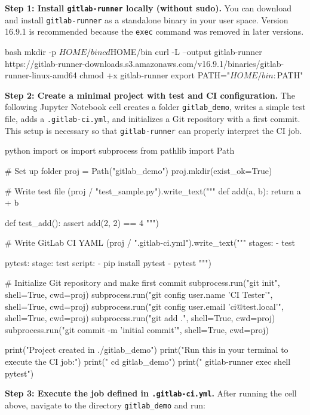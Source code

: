 {\bf Step 1: Install {\tt gitlab-runner} locally (without sudo).} You can download and install {\tt gitlab-runner} as a standalone binary in your user space. Version 16.9.1 is recommended because the {\tt exec} command was removed in later versions.

\begin{codeonly}{bash}
mkdir -p $HOME/bin
cd $HOME/bin
curl -L --output gitlab-runner https://gitlab-runner-downloads.s3.amazonaws.com/v16.9.1/binaries/gitlab-runner-linux-amd64
chmod +x gitlab-runner
export PATH="$HOME/bin:$PATH"
\end{codeonly}

{\bf Step 2: Create a minimal project with test and CI configuration.} The following Jupyter Notebook cell creates a folder {\tt gitlab\_demo}, writes a simple test file, adds a {\tt .gitlab-ci.yml}, and initializes a Git repository with a first commit. This setup is necessary so that {\tt gitlab-runner} can properly interpret the CI job.

\begin{codeonly}{python}
import os
import subprocess
from pathlib import Path

# Set up folder
proj = Path("gitlab_demo")
proj.mkdir(exist_ok=True)

# Write test file
(proj / "test_sample.py").write_text("""
def add(a, b):
    return a + b

def test_add():
    assert add(2, 2) == 4
""")

# Write GitLab CI YAML
(proj / ".gitlab-ci.yml").write_text("""
stages:
  - test

pytest:
  stage: test
  script:
    - pip install pytest
    - pytest
""")

# Initialize Git repository and make first commit
subprocess.run("git init", shell=True, cwd=proj)
subprocess.run("git config user.name 'CI Tester'", shell=True, cwd=proj)
subprocess.run("git config user.email 'ci@test.local'", shell=True, cwd=proj)
subprocess.run("git add .", shell=True, cwd=proj)
subprocess.run("git commit -m 'initial commit'", shell=True, cwd=proj)

print("Project created in ./gitlab\_demo")
print("Run this in your terminal to execute the CI job:")
print("   cd gitlab_demo")
print("   gitlab-runner exec shell pytest")
\end{codeonly}

{\bf Step 3: Execute the job defined in {\tt .gitlab-ci.yml}.} After running the cell above, navigate to the directory {\tt gitlab\_demo} and run:

